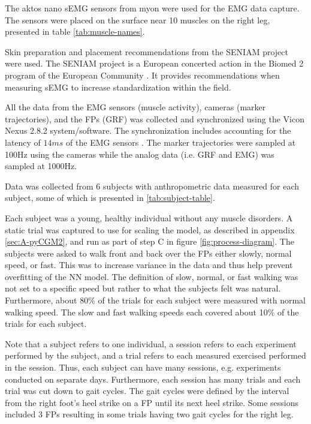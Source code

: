 \documentclass[../main.tex]{subfiles}
\begin{document}
The aktos nano \ac{sEMG} sensors from myon were used for the \ac{EMG} data capture. 
The sensors were placed on the surface near 10 muscles on the right leg, presented in table \ref{tab:muscle-names}. 

Skin preparation and placement recommendations from the SENIAM project \cite{Stegeman2007, Hermens1999, Hermens2000} were used. The SENIAM project is a European concerted action in the Biomed 2 program of the European Community \cite{Stegeman2007}. It provides recommendations when measuring \ac{sEMG} to increase standardization within the field.

All the data from the \ac{EMG} sensors (muscle activity), cameras (marker trajectories), and the \acp{FP} (\ac{GRF}) was collected and synchronized using the Vicon Nexus 2.8.2 system/software.
The synchronization includes accounting for the latency of $14ms$ of the \ac{EMG} sensors \cite{aktosEMG}.
The marker trajectories were sampled at 100Hz using the cameras while the analog data (i.e. \ac{GRF} and \ac{EMG}) was sampled at 1000Hz.

Data was collected from 6 subjects with anthropometric data measured for each subject, some of which is presented in \ref{tab:subject-table}.

Each subject was a young, healthy individual without any muscle disorders.
A static trial was captured to use for scaling the model, as described in appendix \ref{sec:A-pyCGM2}, and run as part of step C in figure \ref{fig:process-diagram}.
The subjects were asked to walk front and back over the \acp{FP} either slowly, normal speed, or fast.
This was to increase variance in the data and thus help prevent overfitting of the \ac{NN} model.
The definition of slow, normal, or fast walking was not set to a specific speed but rather to what the subjects felt was natural.
Furthermore, about 80\% of the trials for each subject were measured with normal walking speed.
The slow and fast walking speeds each covered about 10\% of the trials for each subject.

Note that a subject refers to one individual, a session refers to each experiment performed by the subject, and a trial refers to each measured exercised performed in the session. 
Thus, each subject can have many sessions, e.g. experiments conducted on separate days.
Furthermore, each session has many trials and each trial was cut down to gait cycles. 
The gait cycles were defined by the interval from the right foot's heel strike on a \ac{FP} until its next heel strike.
Some sessions included 3 \acp{FP} resulting in some trials having two gait cycles for the right leg.
\end{document}
